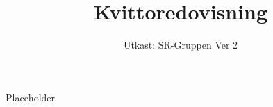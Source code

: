 \documentclass[a4paper]{dtek}
\title{Kvittoredovisning}
\date{Utkast: SR-Gruppen Ver 2}
\begin{document}
Placeholder
\end{document}
